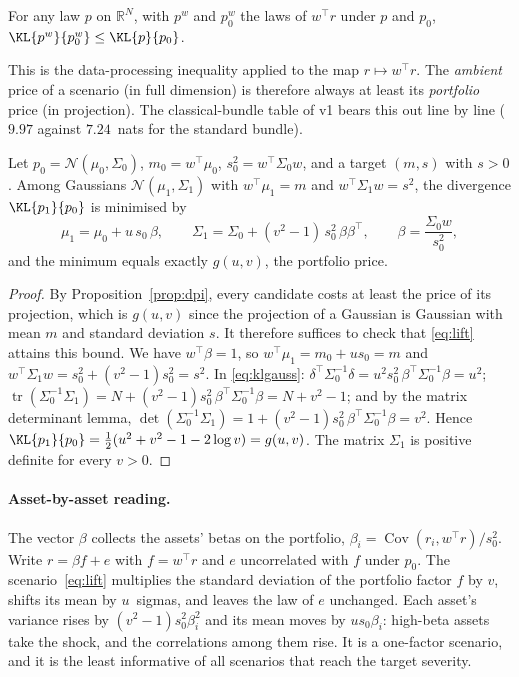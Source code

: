 \begin{proposition}
\label{prop:dpi}
For any law $p$ on $\mathbb R^N$, with $p^w$ and $p_0^w$ the laws of $w^\top r$
under $p$ and $p_0$,
$\KL{p^w}{p_0^w}\le\KL{p}{p_0}$.
\end{proposition}

This is the data-processing inequality \citep{cover2006} applied to the map
$r\mapsto w^\top r$. The \emph{ambient} price of a scenario (in full dimension)
is therefore always at least its \emph{portfolio} price (in projection). The
classical-bundle table of v1 bears this out line by line ($9.97$ against
$7.24$~nats for the standard bundle).

\begin{proposition}
\label{prop:lift}
Let $p_0=\mathcal N(\mu_0,\Sigma_0)$, $m_0=w^\top\mu_0$, $s_0^2=w^\top\Sigma_0w$,
and a target $(m,s)$ with $s>0$. Among Gaussians $\mathcal N(\mu_1,\Sigma_1)$
with $w^\top\mu_1=m$ and $w^\top\Sigma_1w=s^2$, the divergence $\KL{p_1}{p_0}$
is minimised by
\begin{equation}
\label{eq:lift}
\mu_1=\mu_0+u\,s_0\,\beta,\qquad
\Sigma_1=\Sigma_0+(v^2-1)\,s_0^2\,\beta\beta^\top,
\qquad\beta=\frac{\Sigma_0w}{s_0^2},
\end{equation}
and the minimum equals exactly $g(u,v)$, the portfolio price.
\end{proposition}

\begin{proof}
By Proposition~\ref{prop:dpi}, every candidate costs at least the price of its
projection, which is $g(u,v)$ since the projection of a Gaussian is Gaussian
with mean $m$ and standard deviation $s$. It therefore suffices to check that
\eqref{eq:lift} attains this bound. We have $w^\top\beta=1$, so
$w^\top\mu_1=m_0+us_0=m$ and $w^\top\Sigma_1w=s_0^2+(v^2-1)s_0^2=s^2$. In
\eqref{eq:klgauss}: $\delta^\top\Sigma_0^{-1}\delta=u^2s_0^2\,\beta^\top\Sigma_0^{-1}\beta=u^2$;
$\operatorname{tr}(\Sigma_0^{-1}\Sigma_1)=N+(v^2-1)s_0^2\,\beta^\top\Sigma_0^{-1}\beta=N+v^2-1$;
and by the matrix determinant lemma,
$\det(\Sigma_0^{-1}\Sigma_1)=1+(v^2-1)s_0^2\,\beta^\top\Sigma_0^{-1}\beta=v^2$.
Hence $\KL{p_1}{p_0}=\tfrac12(u^2+v^2-1-2\log v)=g(u,v)$. The matrix $\Sigma_1$ is
positive definite for every $v>0$.
\end{proof}

\paragraph{Asset-by-asset reading.} The vector $\beta$ collects the assets'
betas on the portfolio, $\beta_i=\operatorname{Cov}(r_i,w^\top r)/s_0^2$. Write
$r=\beta f+e$ with $f=w^\top r$ and $e$ uncorrelated with $f$ under $p_0$. The
scenario~\eqref{eq:lift} multiplies the standard deviation of the portfolio
factor $f$ by $v$, shifts its mean by $u$~sigmas, and leaves the law of $e$
unchanged. Each asset's variance rises by $(v^2-1)s_0^2\beta_i^2$ and its mean
moves by $us_0\beta_i$: high-beta assets take the shock, and the correlations
among them rise. It is a one-factor scenario, and it is the least informative of
all scenarios that reach the target severity.

